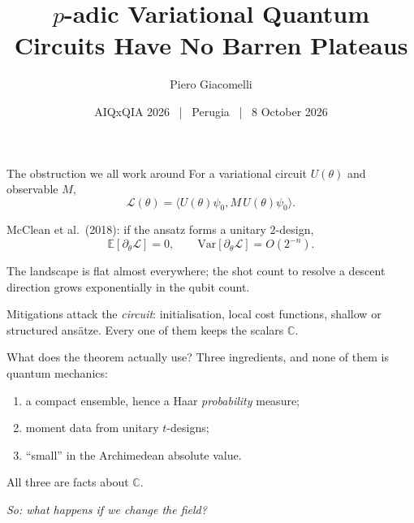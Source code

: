 \documentclass[aspectratio=169,10pt]{beamer}
\title{$p$-adic Variational Quantum Circuits Have No Barren Plateaus}
\author{Piero Giacomelli}
\institute{Tenax SPA, Verona, Italy}
\date{AIQxQIA 2026 \, | \, Perugia \, | \, 8 October 2026}
\newcommand{\loss}{\mathcal{L}}
\newcommand{\inner}[2]{\langle #1, #2\rangle}
\begin{document}
\maketitle

\begin{frame}{The obstruction we all work around}
  For a variational circuit $U(\theta)$ and observable $M$,
  \[
    \loss(\theta)=\inner{U(\theta)\psi_0}{M\,U(\theta)\psi_0}.
  \]

  \alert{McClean et al.\ (2018):} if the ansatz forms a unitary $2$-design,
  \[
    \mathbb{E}[\partial_\theta\loss]=0,
    \qquad
    \mathrm{Var}[\partial_\theta\loss]=O(2^{-n}).
  \]

  \vspace{0.5em}
  The landscape is flat almost everywhere; the shot count to resolve a descent
  direction grows exponentially in the qubit count.

  \vspace{0.5em}
  Mitigations attack the \emph{circuit}: initialisation, local cost functions,
  shallow or structured ansätze. Every one of them keeps the scalars
  $\mathbb{C}$.
\end{frame}

\begin{frame}{What does the theorem actually use?}
  Three ingredients, and none of them is quantum mechanics:

  \vspace{0.6em}
  \begin{enumerate}
    \item a \alert{compact} ensemble, hence a Haar \emph{probability} measure;
    \item moment data from unitary \alert{$t$-designs};
    \item ``small'' in the \alert{Archimedean} absolute value.
  \end{enumerate}

  \vspace{0.8em}
  All three are facts about $\mathbb{C}$.

  \begin{center}
    \emph{So: what happens if we change the field?}
  \end{center}
\end{frame}
\end{document}
